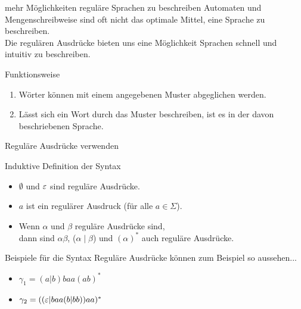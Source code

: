 \begin{frame}[fragile]{mehr Möglichkeiten reguläre Sprachen zu beschreiben}
    Automaten und Mengenschreibweise sind oft nicht das optimale Mittel, eine Sprache zu beschreiben.\\
    Die \alert{regulären Ausdrücke} bieten uns eine Möglichkeit Sprachen schnell und intuitiv zu beschreiben.
    \begin{alertblock}{Funktionsweise}
        \begin{enumerate}
            \item Wörter können mit einem angegebenen Muster abgeglichen werden.
            \item Lässt sich ein Wort durch das Muster beschreiben, ist es in der davon beschriebenen Sprache.
        \end{enumerate}
    \end{alertblock}
\end{frame}

\begin{frame}{Reguläre Ausdrücke verwenden}
    \begin{alertblock}{Induktive Definition der Syntax}
        \begin{itemize}
            \item \alert{$\emptyset$} und \alert{$\varepsilon$} sind reguläre Ausdrücke.
            \item \alert{$a$} ist ein regulärer Ausdruck (für alle $a \in \Sigma$).
            \item Wenn \alert{$\alpha$} und \alert{$\beta$} reguläre Ausdrücke sind,\\dann sind \alert{$\alpha \beta$}, \alert{($\alpha \mid \beta$)} und \alert{$(\alpha)^*$} auch reguläre Ausdrücke.
        \end{itemize}
    \end{alertblock}
    \begin{exampleblock}{Beispiele für die Syntax}
        Reguläre Ausdrücke können zum Beispiel so aussehen...
        \begin{itemize}

            \item $\gamma_1 = (a | b) baa (ab)^*$
            \item $\gamma_2 = ((\varepsilon | baa (b | bb)) aa)^*$
        \end{itemize}
    \end{exampleblock}
\end{frame}

